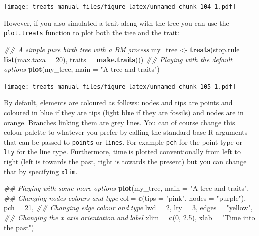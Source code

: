 \documentclass[
]{book}
\newenvironment{Shaded}{\begin{snugshade}}{\end{snugshade}}
\newcommand{\CommentTok}[1]{\textcolor[rgb]{0.56,0.35,0.01}{\textit{#1}}}
\newcommand{\DataTypeTok}[1]{\textcolor[rgb]{0.13,0.29,0.53}{#1}}
\newcommand{\DecValTok}[1]{\textcolor[rgb]{0.00,0.00,0.81}{#1}}
\newcommand{\FloatTok}[1]{\textcolor[rgb]{0.00,0.00,0.81}{#1}}
\newcommand{\KeywordTok}[1]{\textcolor[rgb]{0.13,0.29,0.53}{\textbf{#1}}}
\newcommand{\NormalTok}[1]{#1}
\newcommand{\StringTok}[1]{\textcolor[rgb]{0.31,0.60,0.02}{#1}}
\begin{document}
\texttt{[image: treats\_manual\_files/figure-latex/unnamed-chunk-104-1.pdf]}

However, if you also simulated a trait along with the tree you can use the \texttt{plot.treats} function to plot both the tree and the trait:

\begin{Shaded}
\begin{Highlighting}[]
\CommentTok{\#\# A simple pure birth tree with a BM process}
\NormalTok{my\_tree \textless{}{-}}\StringTok{ }\KeywordTok{treats}\NormalTok{(}\DataTypeTok{stop.rule =} \KeywordTok{list}\NormalTok{(}\DataTypeTok{max.taxa =} \DecValTok{20}\NormalTok{), }\DataTypeTok{traits =} \KeywordTok{make.traits}\NormalTok{())}
\CommentTok{\#\# Playing with the default options}
\KeywordTok{plot}\NormalTok{(my\_tree, }\DataTypeTok{main =} \StringTok{"A tree and traits"}\NormalTok{)}
\end{Highlighting}
\end{Shaded}

\texttt{[image: treats\_manual\_files/figure-latex/unnamed-chunk-105-1.pdf]}

By default, elements are coloured as follows: nodes and tips are points and coloured in blue if they are tips (light blue if they are fossils) and nodes are in orange.
Branches linking them are grey lines.
You can of course change this colour palette to whatever you prefer by calling the standard base R arguments that can be passed to \texttt{points} or \texttt{lines}. For example \texttt{pch} for the point type or \texttt{lty} for the line type.
Furthermore, time is plotted conventionally from left to right (left is towards the past, right is towards the present) but you can change that by specifying \texttt{xlim}.

\begin{Shaded}
\begin{Highlighting}[]
\CommentTok{\#\# Playing with some more options}
\KeywordTok{plot}\NormalTok{(my\_tree, }\DataTypeTok{main =} \StringTok{"A tree and traits"}\NormalTok{,}
     \CommentTok{\#\# Changing nodes colours and type}
     \DataTypeTok{col =} \KeywordTok{c}\NormalTok{(}\DataTypeTok{tips =} \StringTok{"pink"}\NormalTok{, }\DataTypeTok{nodes =} \StringTok{"purple"}\NormalTok{), }\DataTypeTok{pch =} \DecValTok{21}\NormalTok{,}
     \CommentTok{\#\# Changing edge colour and type}
     \DataTypeTok{lwd =} \DecValTok{2}\NormalTok{, }\DataTypeTok{lty =} \DecValTok{3}\NormalTok{, }\DataTypeTok{edges =} \StringTok{"yellow"}\NormalTok{,}
     \CommentTok{\#\# Changing the x axis orientation and label}
     \DataTypeTok{xlim =} \KeywordTok{c}\NormalTok{(}\DecValTok{0}\NormalTok{, }\FloatTok{2.5}\NormalTok{), }\DataTypeTok{xlab =} \StringTok{"Time into the past"}\NormalTok{)}
\end{Highlighting}
\end{Shaded}
\end{document}
